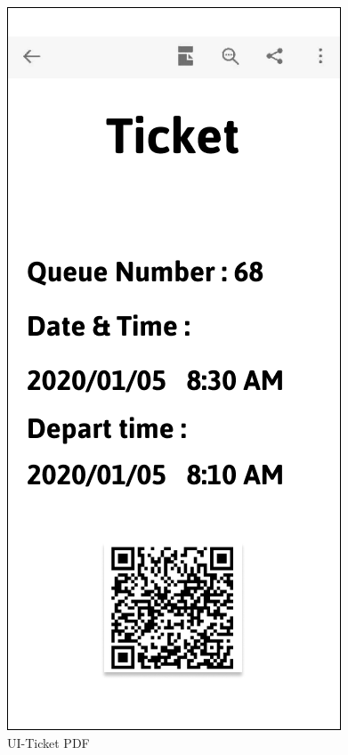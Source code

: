 \documentclass[a4paper,12pt]{report}
\begin{document}
\begin{figure}[H]
\begin{minipage}[t]{0.56\linewidth}
		\includegraphics[scale=0.5]{UI-Ticket PDF.png}
		\caption{UI-Ticket PDF}
		\label{UI-Ticket PDF}
	\end{minipage}
\end{figure}
\end{document}
